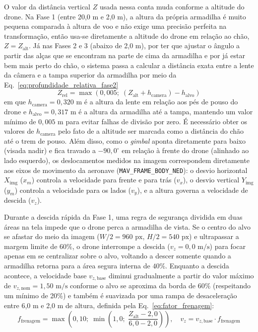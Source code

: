 O valor da distância vertical $Z$ usada nessa conta muda conforme a altitude do drone. Na Fase 1 (entre 20,0 m e 2,0 m), a altura da própria armadilha é muito pequena comparada à altura de voo e não exige uma precisão perfeita na transformação, então usa-se diretamente a altitude do drone em relação ao chão, $Z = Z_{\text{alt}}$. Já nas Fases 2 e 3 (abaixo de 2,0 m), por ter que ajustar o ângulo a partir das alças que se encontram na parte de cima da armadilha e por já estar bem mais perto do chão, o sistema passa a calcular a distância exata entre a lente da câmera e a tampa superior da armadilha por meio da Eq.~\eqref{eq:profundidade_relativa_fase2}
\begin{equation}
	Z_{\text{rel}} = \max\left(0,005;\; (Z_{\text{alt}} + h_{\text{camera}}) - h_{\text{alvo}}\right)
	\label{eq:profundidade_relativa_fase2}
\end{equation}
em que $h_{\text{camera}} = 0,320\text{ m}$ é a altura da lente em relação aos pés de pouso do drone e $h_{\text{alvo}} = 0,317\text{ m}$ é a altura da armadilha até a tampa, mantendo um valor mínimo de $0,005\text{ m}$ para evitar falhas de divisão por zero. É necessário obter os valores de $h_{\text{camera}}$ pelo fato de a altitude ser marcada como a distância do chão até o trem de pouso. Além disso, como o \textit{gimbal} aponta diretamente para baixo (visada nadir) e fica travado a $-90,0^\circ$ em relação à frente do drone (alinhado ao lado esquerdo), os deslocamentos medidos na imagem correspondem diretamente aos eixos de movimento da aeronave (\texttt{MAV\_FRAME\_BODY\_NED}): o desvio horizontal $X_{\text{img}}$ ($x_m$) controla a velocidade para frente e para trás ($v_x$), o desvio vertical $Y_{\text{img}}$ ($y_m$) controla a velocidade para os lados ($v_y$), e a altura governa a velocidade de descida ($v_z$).

Durante a descida rápida da Fase 1, uma regra de segurança dividida em duas áreas na tela impede que o drone perca a armadilha de vista. Se o centro do alvo se afastar do meio da imagem ($W/2 = 960\text{ px}$, $H/2 = 540\text{ px}$) e ultrapassar a margem limite de $60\%$, o drone interrompe a descida ($v_z = 0,0\text{ m/s}$) para focar apenas em se centralizar sobre o alvo, voltando a descer somente quando a armadilha retorna para a área segura interna de $40\%$. Enquanto a descida acontece, a velocidade base $v_{z,\text{base}}$ diminui gradualmente a partir do valor máximo de $v_{z,\text{nom}} = 1,50\text{ m/s}$ conforme o alvo se aproxima da borda de $60\%$ (respeitando um mínimo de 20\%) e também é suavizada por uma rampa de desaceleração entre 6,0 m e 2,0 m de altura, definida pela Eq.~\eqref{eq:fator_frenagem}:
\begin{equation}
	f_{\text{frenagem}} = \max\left(0,10;\; \min\left(1,0;\; \frac{Z_{\text{alt}} - 2,0}{6,0 - 2,0}\right)\right), \quad v_z = v_{z,\text{base}} \cdot f_{\text{frenagem}}
	\label{eq:fator_frenagem}
\end{equation}

